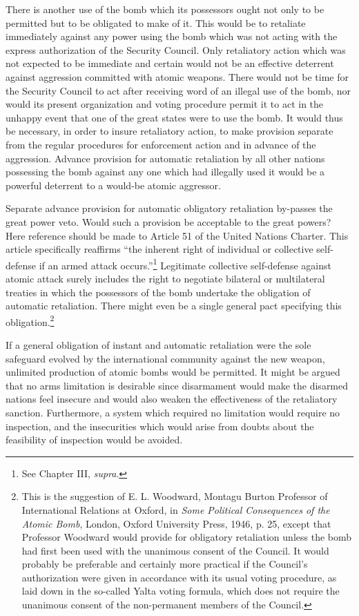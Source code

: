 There is another use of the bomb which its possessors ought not only to be permitted but to be obligated to make of it. This would be to retaliate immediately against any power using the bomb which was not acting with the express authorization of the Security Council. Only retaliatory action which was not expected to be immediate and certain would not be an effective deterrent against aggression committed with atomic weapons. There would not be time for the Security Council to act after receiving word of an illegal use of the bomb, nor would its present organization and voting procedure permit it to act in the unhappy event that one of the great states were to use the bomb. It would thus be necessary, in order to insure retaliatory action, to make provision separate from the regular procedures for enforcement action and in advance of the aggression. Advance provision for automatic retaliation by all other nations possessing the bomb against any one which had illegally used it would be a powerful deterrent to a would-be atomic aggressor.

Separate advance provision for automatic obligatory retaliation by-passes the great power veto. Would such a provision be acceptable to the great powers? Here reference should be made to Article 51 of the United Nations Charter. This article specifically reaffirms ``the inherent right of individual or collective self-defense if an armed attack occurs.''\footnote{See Chapter III, \textit{supra}.} Legitimate collective self-defense
against atomic attack surely includes the right to negotiate bilateral or multilateral treaties in which the possessors of the bomb undertake the obligation of automatic retaliation. There might even be a single general pact specifying this obligation.\footnote{This is the suggestion of E. L. Woodward, Montagu Burton Professor of International Relations at Oxford, in \textit{Some Political Consequences of the Atomic Bomb}, London, Oxford University Press, 1946, p. 25, except that Professor Woodward would provide for obligatory retaliation unless the bomb had first been used with the unanimous consent of the Council. It would probably be preferable and certainly more practical if the Council's authorization were given in accordance with its usual voting procedure, as laid down in the so-called Yalta voting formula, which does not require the unanimous consent of the non-permanent members of the Council.}

If a general obligation of instant and automatic retaliation were the sole safeguard evolved by the international community against the new weapon, unlimited production of atomic bombs would be permitted. It might be argued that no arms limitation is desirable since disarmament would make the disarmed nations feel insecure and would also weaken the effectiveness of the retaliatory sanction. Furthermore, a system which required no limitation would require no inspection, and the insecurities which would arise from doubts about the feasibility of inspection would be avoided.

